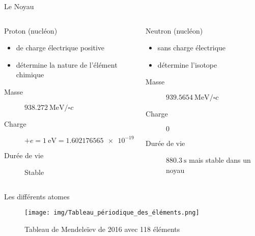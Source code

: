 \documentclass[handout,8pt]{beamer} %
\begin{document}
\begin{frame}{Le Noyau}
	\begin{columns}
		\begin{column}{0.45\textwidth}
			\begin{block}{Proton (nucléon)}
				\begin{itemize}
					\item de charge électrique positive
					\item détermine la nature de l'élément chimique 
				\end{itemize}
				\begin{description}
					\item[Masse] $\SI{938,272}{\MeV \per\square c}$
					\item[Charge] $+e = \SI{1}{\eV} = \SI{1,602176565e-19}{\coulomb}$
					\item[Durée de vie] Stable
				\end{description}
			\end{block}
		\end{column}
		\begin{column}{0.45\textwidth}
			\begin{block}{Neutron (nucléon)}
				\begin{itemize}
					\item sans charge électrique
					\item détermine l'isotope 
				\end{itemize}
				\begin{description}
					\item[Masse] $\SI{939,5654}{\MeV \per\square c}$
					\item[Charge] $\SI{0}{}$
					\item[Durée de vie] $\SI{880,3}{\second}$ mais stable dans un noyau
				\end{description}
			\end{block}
		\end{column}
	\end{columns}		
\end{frame}

\begin{frame}{Les différents atomes}
	\begin{figure}
		\texttt{[image: img/Tableau\_périodique\_des\_éléments.png]} 
		\caption{Tableau de Mendeleïev de 2016 avec 118 éléments\cite{element}}
		\label{fig:mendeleiev}
	\end{figure}
\end{frame}
\end{document}
